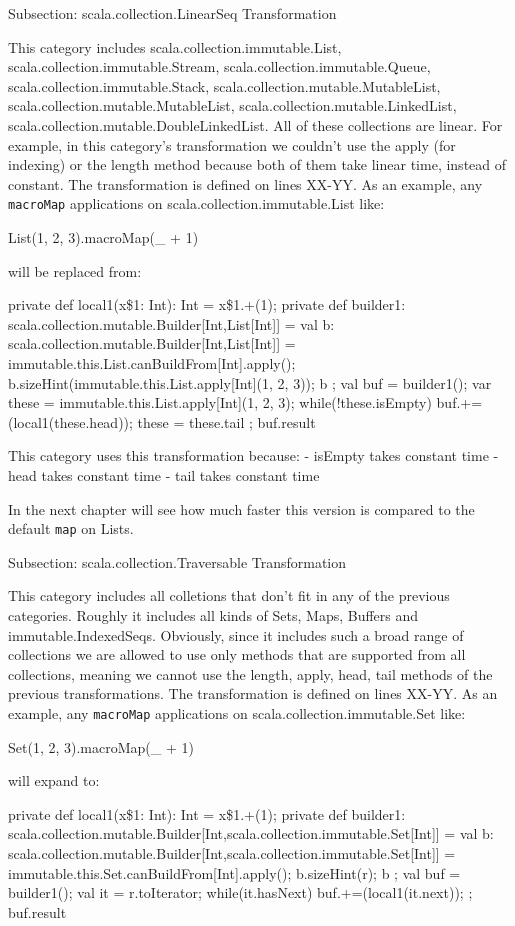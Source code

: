 Subsection: scala.collection.LinearSeq Transformation

This category includes scala.collection.immutable.List,
scala.collection.immutable.Stream, scala.collection.immutable.Queue,
scala.collection.immutable.Stack, scala.collection.mutable.MutableList,
scala.collection.mutable.MutableList, scala.collection.mutable.LinkedList,
scala.collection.mutable.DoubleLinkedList. All of these collections are linear.
For example, in this category's transformation we couldn't use the apply (for
indexing) or the length method because both of them take linear time, instead of
constant. The transformation is defined on lines XX-YY. As an example, any
\texttt{macroMap} applications on scala.collection.immutable.List like:

List(1, 2, 3).macroMap(\_ + 1)

will be replaced from:

{
  private def local1(x\$1: Int): Int = x\$1.+(1);
  private def builder1: scala.collection.mutable.Builder[Int,List[Int]] = {
    val b: scala.collection.mutable.Builder[Int,List[Int]] =
immutable.this.List.canBuildFrom[Int].apply();
    b.sizeHint(immutable.this.List.apply[Int](1, 2, 3));
    b
  };
  val buf = builder1();
  var these = immutable.this.List.apply[Int](1, 2, 3);
  while(!these.isEmpty){
    buf.+=(local1(these.head));
    these = these.tail
  };
  buf.result
}

This category uses this transformation because:
- isEmpty takes constant time
- head takes constant time
- tail takes constant time

In the next chapter will see how much faster this version is compared to the
default \texttt{map} on Lists.

Subsection: scala.collection.Traversable Transformation

This category includes all colletions that don't fit in any of the previous
categories. Roughly it includes all kinds of Sets, Maps, Buffers and
immutable.IndexedSeqs. Obviously, since it includes such a broad range of
collections we are allowed to use only methods that are supported from all
collections, meaning we cannot use the length, apply, head, tail methods of the
previous transformations. The transformation is defined on lines XX-YY. As an
example, any \texttt{macroMap} applications on scala.collection.immutable.Set like:

Set(1, 2, 3).macroMap(\_ + 1)

will expand to:

{
  private def local1(x\$1: Int): Int = x\$1.+(1);
  private def builder1:
scala.collection.mutable.Builder[Int,scala.collection.immutable.Set[Int]] = {
    val b:
scala.collection.mutable.Builder[Int,scala.collection.immutable.Set[Int]] =
immutable.this.Set.canBuildFrom[Int].apply();
    b.sizeHint(r);
    b
  };
  val buf = builder1();
  val it = r.toIterator;
  while(it.hasNext){
    buf.+=(local1(it.next));
  };
  buf.result
}


